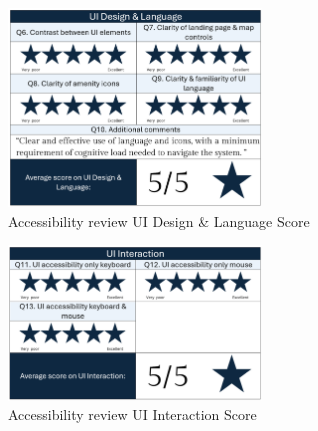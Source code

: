 \begin{figure}[htbp]
    \centering
    \includegraphics[width=0.6\textwidth]{images/accessb-survey-design.png}
    \caption{Accessibility review \- UI Design \& Language Score}
    \label{fig:accessbdesignscore}
\end{figure}

\begin{figure}[htbp]
    \centering
    \includegraphics[width=0.6\textwidth]{images/accessb-survey-interaction.png}
    \caption{Accessibility review \- UI Interaction Score}
    \label{fig:accessbinteractionscore}
\end{figure}

\newpage{}